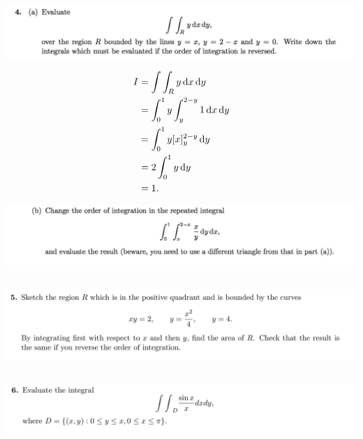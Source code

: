 \newpage
\subsection{}

\begin{mdframed}
  \includegraphics[width=400pt]{img/oxford-prelims-M5-multivariable-calc-1-4-a.png}
\end{mdframed}

\begin{align*}
  I &= \int\int_R y \dx \dy \\
    &= \int_0^1 y \int_y^{2-y} 1 \dx \dy \\
    &= \int_0^1 y [x]_y^{2-y} \dy \\
    &= 2\int_0^1 y \dy \\
    &= 1.
\end{align*}

\begin{mdframed}
  \includegraphics[width=400pt]{img/oxford-prelims-M5-multivariable-calc-1-4-b.png}
\end{mdframed}

\subsection{}
\begin{mdframed}
  \includegraphics[width=400pt]{img/oxford-prelims-M5-multivariable-calc-1-5.png}
\end{mdframed}

\subsection{}
\begin{mdframed}
  \includegraphics[width=400pt]{img/oxford-prelims-M5-multivariable-calc-1-6.png}
\end{mdframed}

